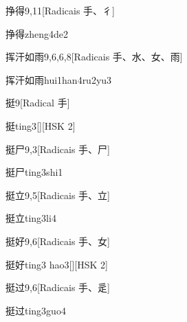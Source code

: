 \begin{entry}{挣得}{9,11}[Radicais ⼿、⼻]
  \begin{phonetics}{挣得}{zheng4de2}
  \end{phonetics}
\end{entry}

\begin{entry}{挥汗如雨}{9,6,6,8}[Radicais ⼿、⽔、⼥、⾬]
  \begin{phonetics}{挥汗如雨}{hui1han4ru2yu3}
  \end{phonetics}
\end{entry}

\begin{entry}{挺}{9}[Radical ⼿]
  \begin{phonetics}{挺}{ting3}[][HSK 2]
  \end{phonetics}
\end{entry}

\begin{entry}{挺尸}{9,3}[Radicais ⼿、⼫]
  \begin{phonetics}{挺尸}{ting3shi1}
  \end{phonetics}
\end{entry}

\begin{entry}{挺立}{9,5}[Radicais ⼿、⽴]
  \begin{phonetics}{挺立}{ting3li4}
  \end{phonetics}
\end{entry}

\begin{entry}{挺好}{9,6}[Radicais ⼿、⼥]
  \begin{phonetics}{挺好}{ting3 hao3}[][HSK 2]
  \end{phonetics}
\end{entry}

\begin{entry}{挺过}{9,6}[Radicais ⼿、⾡]
  \begin{phonetics}{挺过}{ting3guo4}
  \end{phonetics}
\end{entry}

